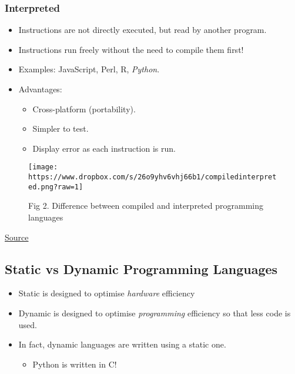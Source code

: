 \documentclass[11pt]{article}
\makeatletter
\def\maxwidth{\ifdim\Gin@nat@width>\linewidth\linewidth
    \else\Gin@nat@width\fi}
\let\Oldincludegraphics\includegraphics
\renewcommand{\includegraphics}[1]{\Oldincludegraphics[width=.8\maxwidth]{#1}}
\providecommand{\tightlist}{%
      \setlength{\itemsep}{0pt}\setlength{\parskip}{0pt}}
\makeatother
\begin{document}
    \subsubsection{Interpreted}\label{interpreted}

\begin{itemize}
\tightlist
\item
  Instructions are not directly executed, but read by another program.
\item
  Instructions run freely without the need to compile them first!
\item
  Examples: JavaScript, Perl, R, \emph{Python}.
\item
  Advantages:

  \begin{itemize}
  \tightlist
  \item
    Cross-platform (portability).
  \item
    Simpler to test.
  \item
    Display error as each instruction is run.
  \end{itemize}
\end{itemize}

    \begin{figure}
\centering
\texttt{[image: https://www.dropbox.com/s/26o9yhv6vhj66b1/compiledinterpreted.png?raw=1]}
\caption{Fig 2. Difference between compiled and interpreted programming
languages}
\end{figure}

\href{https://www.google.com/url?sa=i\&rct=j\&q=\&esrc=s\&source=images\&cd=\&cad=rja\&uact=8\&ved=2ahUKEwichoGF1KXkAhVOdhoKHebmAJwQjRx6BAgBEAQ\&url=\%2Furl\%3Fsa\%3Di\%26rct\%3Dj\%26q\%3D\%26esrc\%3Ds\%26source\%3Dimages\%26cd\%3D\%26ved\%3D\%26url\%3Dhttps\%253A\%252F\%252Fmedium.com\%252Ffrom-the-scratch\%252Fstop-it-there-are-no-compiled-and-interpreted-languages-512f84756664\%26psig\%3DAOvVaw0CqS9Nmdo4wbc9J-p4WtL-\%26ust\%3D1567083827896505\&psig=AOvVaw0CqS9Nmdo4wbc9J-p4WtL-\&ust=1567083827896505}{Source}

    \subsection{Static vs Dynamic Programming
Languages}\label{static-vs-dynamic-programming-languages}

\begin{itemize}
\tightlist
\item
  Static is designed to optimise \emph{hardware} efficiency
\item
  Dynamic is designed to optimise \emph{programming} efficiency so that
  less code is used.
\item
  In fact, dynamic languages are written using a static one.

  \begin{itemize}
  \tightlist
  \item
    Python is written in C!
  \end{itemize}
\end{itemize}
\end{document}
